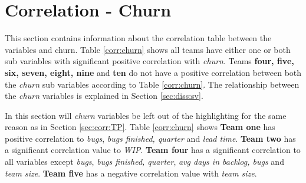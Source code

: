 \documentclass[UKenglish]{ifimaster}  %
\begin{document}
 
 

\section{Correlation - Churn}
\label{sec:corr:churn}
This section contains information about the correlation table between the variables and churn. Table \ref{corr:churn} shows all teams have either one or both sub variables with significant positive correlation with \textit{churn}. Teams \textbf{four, five, six, seven, eight, nine} and \textbf{ten} do not have a positive correlation between both the \textit{churn} sub variables according to Table \ref{corr:churn}. The relationship between the \textit{churn} variables is explained in Section \ref{sec:diss:sv}. 

In this section will \textit{churn} variables be left out of the highlighting for the same reason as in Section \ref{sec:corr:TP}.
Table \ref{corr:churn} shows \textbf{Team one} has positive correlation to \textit{bugs}, \textit{bugs finished, quarter} and \textit{lead time}. \textbf{Team two} has a significant correlation value to \textit{WIP}. \textbf{Team four} has a significant correlation to all variables except \textit{bugs}, \textit{bugs finished, quarter}, \textit{avg days in backlog, bugs} and \textit{team size}. \textbf{Team five} has a negative correlation value with \textit{team size}. 
\end{document}
